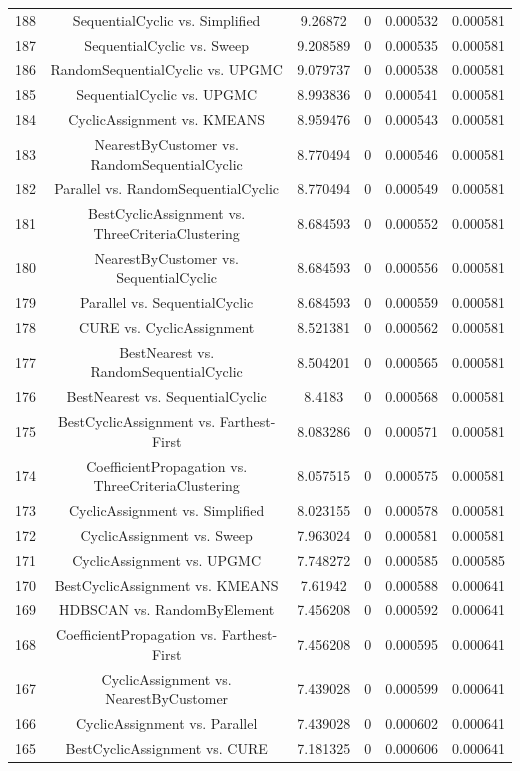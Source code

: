 \documentclass[a4paper,10pt]{article}
\begin{document}
\begin{landscape}
\begin{table}[!htp]
\begin{tabular}{cccccc}
188&SequentialCyclic vs. Simplified&9.26872&0&0.000532&0.000581\\
187&SequentialCyclic vs. Sweep&9.208589&0&0.000535&0.000581\\
186&RandomSequentialCyclic vs. UPGMC&9.079737&0&0.000538&0.000581\\
185&SequentialCyclic vs. UPGMC&8.993836&0&0.000541&0.000581\\
184&CyclicAssignment vs. KMEANS&8.959476&0&0.000543&0.000581\\
183&NearestByCustomer vs. RandomSequentialCyclic&8.770494&0&0.000546&0.000581\\
182&Parallel vs. RandomSequentialCyclic&8.770494&0&0.000549&0.000581\\
181&BestCyclicAssignment vs. ThreeCriteriaClustering&8.684593&0&0.000552&0.000581\\
180&NearestByCustomer vs. SequentialCyclic&8.684593&0&0.000556&0.000581\\
179&Parallel vs. SequentialCyclic&8.684593&0&0.000559&0.000581\\
178&CURE vs. CyclicAssignment&8.521381&0&0.000562&0.000581\\
177&BestNearest vs. RandomSequentialCyclic&8.504201&0&0.000565&0.000581\\
176&BestNearest vs. SequentialCyclic&8.4183&0&0.000568&0.000581\\
175&BestCyclicAssignment vs. Farthest-First&8.083286&0&0.000571&0.000581\\
174&CoefficientPropagation vs. ThreeCriteriaClustering&8.057515&0&0.000575&0.000581\\
173&CyclicAssignment vs. Simplified&8.023155&0&0.000578&0.000581\\
172&CyclicAssignment vs. Sweep&7.963024&0&0.000581&0.000581\\
171&CyclicAssignment vs. UPGMC&7.748272&0&0.000585&0.000585\\
170&BestCyclicAssignment vs. KMEANS&7.61942&0&0.000588&0.000641\\
169&HDBSCAN vs. RandomByElement&7.456208&0&0.000592&0.000641\\
168&CoefficientPropagation vs. Farthest-First&7.456208&0&0.000595&0.000641\\
167&CyclicAssignment vs. NearestByCustomer&7.439028&0&0.000599&0.000641\\
166&CyclicAssignment vs. Parallel&7.439028&0&0.000602&0.000641\\
165&BestCyclicAssignment vs. CURE&7.181325&0&0.000606&0.000641\\

\end{tabular}
\end{table}
\end{landscape}
\end{document}
